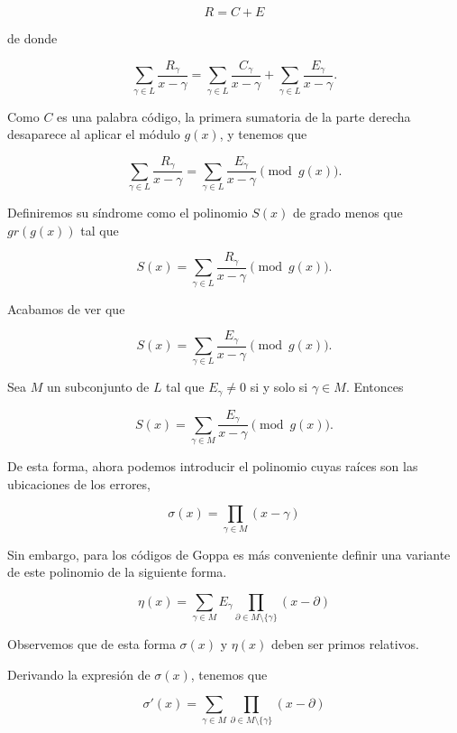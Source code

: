 $$R = C + E$$

de donde 

$$\sum_{\gamma \in L} \frac{R_\gamma}{x - \gamma} = \sum_{\gamma \in L} \frac{C_\gamma}{x - \gamma} + \sum_{\gamma \in L} \frac{E_\gamma}{x - \gamma}.$$

Como $C$ es una palabra código, la primera sumatoria de la parte derecha desaparece al aplicar el módulo $g(x)$, y tenemos que

$$\sum_{\gamma \in L} \frac{R_\gamma}{x - \gamma} = \sum_{\gamma \in L} \frac{E_\gamma}{x - \gamma} \pmod{g(x)}.$$

Definiremos su síndrome como el polinomio $S(x)$ de grado menos que $gr(g(x))$ tal que 

$$S(x) = \sum_{\gamma \in L} \frac{R_\gamma}{x - \gamma} \pmod{g(x)}.$$

Acabamos de ver que 

$$S(x) = \sum_{\gamma \in L} \frac{E_\gamma}{x - \gamma} \pmod{g(x)}.$$

Sea $M$ un subconjunto de $L$ tal que $E_{\gamma} \neq 0$ si y solo si $\gamma \in M$. Entonces

\begin{equation}
    \label{def:sindrome}
    S(x) = \sum_{\gamma \in M} \frac{E_\gamma}{x - \gamma} \pmod{g(x)}.
\end{equation}

De esta forma, ahora podemos introducir el polinomio cuyas raíces son las ubicaciones de los errores,

\begin{equation}
    \label{def:localizaciones}
    \sigma (x) = \prod_{\gamma \in M} (x - \gamma)
\end{equation}

Sin embargo, para los códigos de Goppa es más conveniente definir una variante de este polinomio de la siguiente forma.

\begin{equation}
    \label{def:eta}
    \eta (x) = \sum_{\gamma \in M} E_\gamma \prod_{\partial \in M \setminus \{ \gamma \} } (x - \partial)
\end{equation}

Observemos que de esta forma $\sigma(x)$ y $\eta(x)$ deben ser primos relativos.

Derivando la expresión de $\sigma(x)$, tenemos que 

\begin{equation}
    \label{def:localizaciones_derivada}
    \sigma'(x) = \sum_{\gamma \in M} \prod_{\partial \in M \setminus \{ \gamma \} } (x - \partial)
\end{equation}


